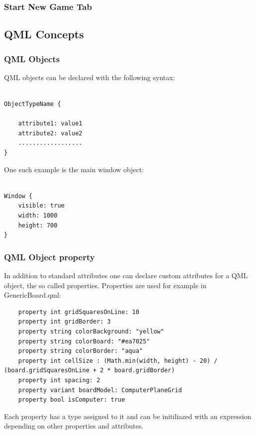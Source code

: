 \subsubsection {Start New Game Tab}

\subsection {QML Concepts}

\subsubsection {QML Objects}

QML objects can be declared with the following syntax: 

\begin{lstlisting}

ObjectTypeName {

	attribute1: value1
	attribute2: value2
	..................
}

\end{lstlisting}

One such example is the main window object:

\begin{lstlisting}

Window {
	visible: true
	width: 1000
	height: 700
}

\end{lstlisting}

\subsubsection {QML Object property}

In addition to standard attributes one can declare custom attributes for a QML object, the so called properties. Properties are used for example in GenericBoard.qml:

\begin{lstlisting}
	property int gridSquaresOnLine: 10
	property int gridBorder: 3
	property string colorBackground: "yellow"
	property string colorBoard: "#ea7025"
	property string colorBorder: "aqua"
	property int cellSize : (Math.min(width, height) - 20) / (board.gridSquaresOnLine + 2 * board.gridBorder)
	property int spacing: 2
	property variant boardModel: ComputerPlaneGrid
	property bool isComputer: true
\end{lstlisting}

Each property has a type assigned to it and can be initiliazed with an expression depending on other properties and attributes.

